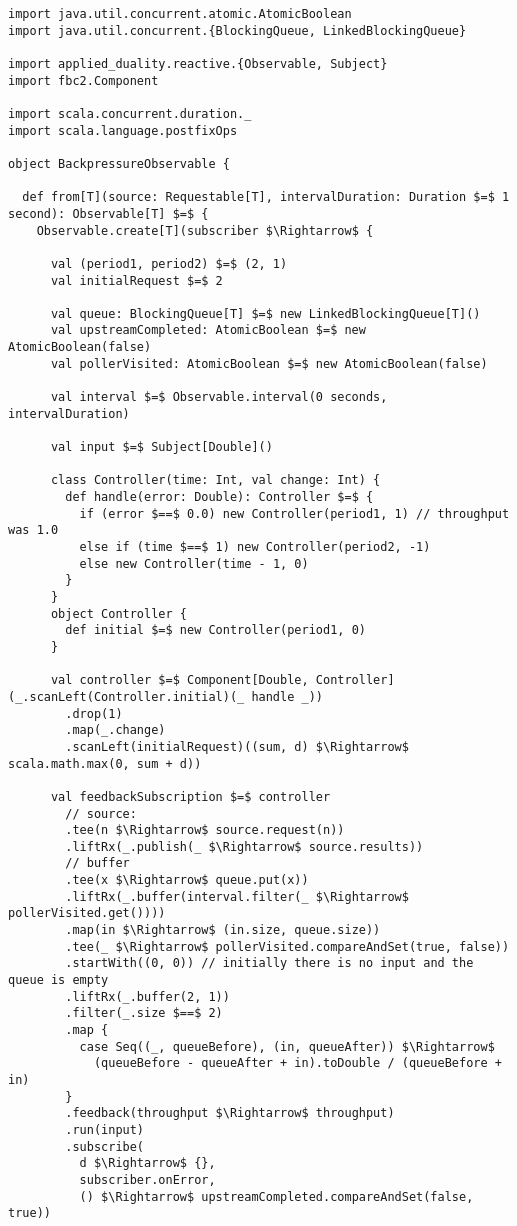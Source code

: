 \begin{lstlisting}[style=ScalaStyle, caption={Implementation of \code{BackpressureObservable}}]
import java.util.concurrent.atomic.AtomicBoolean
import java.util.concurrent.{BlockingQueue, LinkedBlockingQueue}

import applied_duality.reactive.{Observable, Subject}
import fbc2.Component

import scala.concurrent.duration._
import scala.language.postfixOps

object BackpressureObservable {

  def from[T](source: Requestable[T], intervalDuration: Duration $=$ 1 second): Observable[T] $=$ {
    Observable.create[T](subscriber $\Rightarrow$ {

      val (period1, period2) $=$ (2, 1)
      val initialRequest $=$ 2

      val queue: BlockingQueue[T] $=$ new LinkedBlockingQueue[T]()
      val upstreamCompleted: AtomicBoolean $=$ new AtomicBoolean(false)
      val pollerVisited: AtomicBoolean $=$ new AtomicBoolean(false)

      val interval $=$ Observable.interval(0 seconds, intervalDuration)

      val input $=$ Subject[Double]()

      class Controller(time: Int, val change: Int) {
        def handle(error: Double): Controller $=$ {
          if (error $==$ 0.0) new Controller(period1, 1) // throughput was 1.0
          else if (time $==$ 1) new Controller(period2, -1)
          else new Controller(time - 1, 0)
        }
      }
      object Controller {
        def initial $=$ new Controller(period1, 0)
      }

      val controller $=$ Component[Double, Controller](_.scanLeft(Controller.initial)(_ handle _))
        .drop(1)
        .map(_.change)
        .scanLeft(initialRequest)((sum, d) $\Rightarrow$ scala.math.max(0, sum + d))

      val feedbackSubscription $=$ controller
        // source:
        .tee(n $\Rightarrow$ source.request(n))
        .liftRx(_.publish(_ $\Rightarrow$ source.results))
        // buffer
        .tee(x $\Rightarrow$ queue.put(x))
        .liftRx(_.buffer(interval.filter(_ $\Rightarrow$ pollerVisited.get())))
        .map(in $\Rightarrow$ (in.size, queue.size))
        .tee(_ $\Rightarrow$ pollerVisited.compareAndSet(true, false))
        .startWith((0, 0)) // initially there is no input and the queue is empty
        .liftRx(_.buffer(2, 1))
        .filter(_.size $==$ 2)
        .map {
          case Seq((_, queueBefore), (in, queueAfter)) $\Rightarrow$
            (queueBefore - queueAfter + in).toDouble / (queueBefore + in)
        }
        .feedback(throughput $\Rightarrow$ throughput)
        .run(input)
        .subscribe(
          d $\Rightarrow$ {},
          subscriber.onError,
          () $\Rightarrow$ upstreamCompleted.compareAndSet(false, true))


\end{lstlisting}
